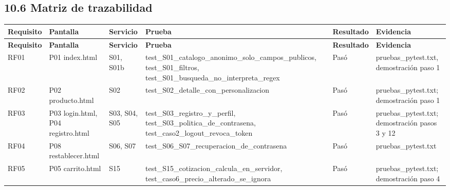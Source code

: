 \documentclass[10pt,letterpaper]{article}
\begin{document}
\subsection*{10.6 Matriz de trazabilidad}
{\footnotesize
\begin{longtable}{|P{\tabcolsep\relax}|P{\tabcolsep\relax}|P{\tabcolsep\relax}|P{\tabcolsep\relax}|P{\tabcolsep\relax}|P{\tabcolsep\relax}|}
\hline
\textbf{Requisito} & \textbf{Pantalla} & \textbf{Servicio} & \textbf{Prueba} & \textbf{Resultado} & \textbf{Evidencia} \\ \hline
\endfirsthead
\hline
\textbf{Requisito} & \textbf{Pantalla} & \textbf{Servicio} & \textbf{Prueba} & \textbf{Resultado} & \textbf{Evidencia} \\ \hline
\endhead
RF01 & P01 index.\allowbreak{}html & S01, S01b  & test\_\allowbreak{}S01\_\allowbreak{}catalogo\_\allowbreak{}anonimo\_\allowbreak{}solo\_\allowbreak{}campos\_\allowbreak{}publicos, test\_\allowbreak{}S01\_\allowbreak{}filtros, test\_\allowbreak{}S01\_\allowbreak{}busqueda\_\allowbreak{}no\_\allowbreak{}interpreta\_\allowbreak{}regex & Pasó & pruebas\_\allowbreak{}pytest.\allowbreak{}txt, demostración paso 1 \\ \hline
RF02 & P02 producto.\allowbreak{}html & S02  & test\_\allowbreak{}S02\_\allowbreak{}detalle\_\allowbreak{}con\_\allowbreak{}personalizacion & Pasó & pruebas\_\allowbreak{}pytest.\allowbreak{}txt; demostración paso 1 \\ \hline
RF03 & P03 login.\allowbreak{}html, P04 registro.\allowbreak{}html & S03, S04, S05  & test\_\allowbreak{}S03\_\allowbreak{}registro\_\allowbreak{}y\_\allowbreak{}perfil, test\_\allowbreak{}S03\_\allowbreak{}politica\_\allowbreak{}de\_\allowbreak{}contrasena, test\_\allowbreak{}caso2\_\allowbreak{}logout\_\allowbreak{}revoca\_\allowbreak{}token & Pasó & pruebas\_\allowbreak{}pytest.\allowbreak{}txt; demostración pasos 3 y 12 \\ \hline
RF04 & P08 restablecer.\allowbreak{}html & S06, S07  & test\_\allowbreak{}S06\_\allowbreak{}S07\_\allowbreak{}recuperacion\_\allowbreak{}de\_\allowbreak{}contrasena & Pasó & pruebas\_\allowbreak{}pytest.\allowbreak{}txt \\ \hline
RF05 & P05 carrito.\allowbreak{}html & S15  & test\_\allowbreak{}S15\_\allowbreak{}cotizacion\_\allowbreak{}calcula\_\allowbreak{}en\_\allowbreak{}servidor, test\_\allowbreak{}caso6\_\allowbreak{}precio\_\allowbreak{}alterado\_\allowbreak{}se\_\allowbreak{}ignora & Pasó & pruebas\_\allowbreak{}pytest.\allowbreak{}txt; demostración paso 4 \\ \hline

\end{longtable}}
\end{document}
